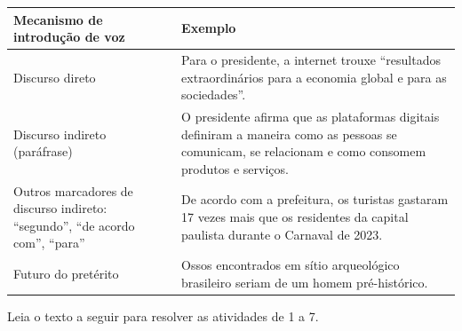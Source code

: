 \begin{longtable}[]{@{}ll@{}}
\toprule
\begin{minipage}[b]{0.46\columnwidth}\raggedright
\textbf{Mecanismo de introdução de voz}\strut
\end{minipage} & \begin{minipage}[b]{0.46\columnwidth}\raggedright
\textbf{Exemplo}\strut
\end{minipage}\tabularnewline
\midrule
\endhead
\begin{minipage}[t]{0.46\columnwidth}\raggedright
Discurso direto\strut
\end{minipage} & \begin{minipage}[t]{0.46\columnwidth}\raggedright
Para o presidente, a internet trouxe ``resultados extraordinários para a
economia global e para as sociedades''.\strut
\end{minipage}\tabularnewline
\begin{minipage}[t]{0.46\columnwidth}\raggedright
Discurso indireto (paráfrase)\strut
\end{minipage} & \begin{minipage}[t]{0.46\columnwidth}\raggedright
O presidente afirma que as plataformas digitais definiram a maneira como
as pessoas se comunicam, se relacionam e como consomem produtos e
serviços.\strut
\end{minipage}\tabularnewline
\begin{minipage}[t]{0.46\columnwidth}\raggedright
Outros marcadores de discurso indireto: ``segundo'', ``de acordo com'',
``para''\strut
\end{minipage} & \begin{minipage}[t]{0.46\columnwidth}\raggedright
De acordo com a prefeitura, os turistas gastaram 17 vezes mais que os
residentes da capital paulista durante o Carnaval de 2023.\strut
\end{minipage}\tabularnewline
\begin{minipage}[t]{0.46\columnwidth}\raggedright
Futuro do pretérito\strut
\end{minipage} & \begin{minipage}[t]{0.46\columnwidth}\raggedright
Ossos encontrados em sítio arqueológico brasileiro seriam de um homem
pré-histórico.\strut
\end{minipage}\tabularnewline
\bottomrule
\end{longtable}


Leia o texto a seguir para resolver as atividades de 1 a 7.

